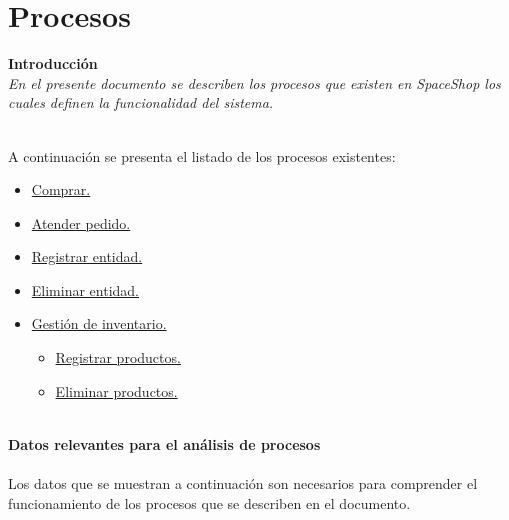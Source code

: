 \chapter{Procesos}
\textbf{\Large Introducci\'on \\}
\textit{En el presente documento se describen los procesos que existen en SpaceShop los cuales definen la funcionalidad del sistema. \\ \\}

A continuaci\'on se presenta el listado de los procesos existentes:
\begin{itemize}
	\item \hyperlink{procesoCompra}{Comprar.}
	\item \hyperlink{procesoAtenderPedido}{Atender pedido.}
	\item \hyperlink{procesoRegistrarEntidad}{Registrar entidad.}
	\item \hyperlink{procesoEliminarEntidad}{Eliminar entidad.}
	\item \hyperlink{procesoGestionDeInventario}{Gesti\'on de inventario.}
	\begin{itemize}
		\item \hyperlink{procesoRegistrarProductos}{Registrar productos.}
		\item \hyperlink{procesoEliminarProductos}{Eliminar productos.}	
	\end{itemize}
\end{itemize}

\newpage
\textit{\\}
\textbf{\Large Datos relevantes para el an\'alisis de procesos\\\\}
Los datos que se muestran a continuaci\'on son necesarios para comprender el funcionamiento de los procesos que se describen en el documento.
\textit{\\}

